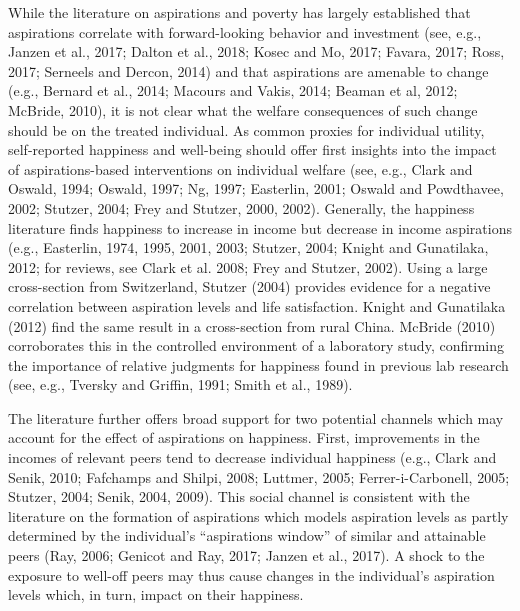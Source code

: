 \documentclass[11.5pt]{article}
\begin{document}
While the literature on aspirations and poverty has largely established that aspirations correlate with forward-looking behavior and investment (see, e.g., Janzen et al., 2017; Dalton et al., 2018; Kosec and Mo, 2017; Favara, 2017; Ross, 2017; Serneels and Dercon, 2014) and that aspirations are amenable to change (e.g., Bernard et al., 2014; Macours and Vakis, 2014; Beaman et al, 2012; McBride, 2010), it is not clear what the welfare consequences of such change should be on the treated individual. As common proxies for individual utility, self-reported happiness and well-being should offer first insights into the impact of aspirations-based interventions on individual welfare (see, e.g., Clark and Oswald, 1994; Oswald, 1997; Ng, 1997; Easterlin, 2001; Oswald and Powdthavee, 2002; Stutzer, 2004; Frey and Stutzer, 2000, 2002). Generally, the happiness literature finds happiness to increase in income but decrease in income aspirations (e.g., Easterlin, 1974, 1995, 2001, 2003; Stutzer, 2004; Knight and Gunatilaka, 2012; for reviews, see Clark et al. 2008; Frey and Stutzer, 2002). Using a large cross-section from Switzerland, Stutzer (2004) provides evidence for a negative correlation between aspiration levels and life satisfaction. Knight and Gunatilaka (2012) find the same result in a cross-section from rural China. McBride (2010) corroborates this in the controlled environment of a laboratory study, confirming the importance of relative judgments for happiness found in previous lab research (see, e.g., Tversky and Griffin, 1991; Smith et al., 1989). 

The literature further offers broad support for two potential channels which may account for the effect of aspirations on happiness. First, improvements in the incomes of relevant peers tend to decrease individual happiness (e.g., Clark and Senik, 2010; Fafchamps and Shilpi, 2008; Luttmer, 2005; Ferrer-i-Carbonell, 2005; Stutzer, 2004; Senik, 2004, 2009). This social channel is consistent with the literature on the formation of aspirations which models aspiration levels as partly determined by the individual's ``aspirations window'' of similar and attainable peers (Ray, 2006; Genicot and Ray, 2017; Janzen et al., 2017). A shock to the exposure to well-off peers may thus cause changes in the individual's aspiration levels which, in turn, impact on their happiness. 
\end{document}
